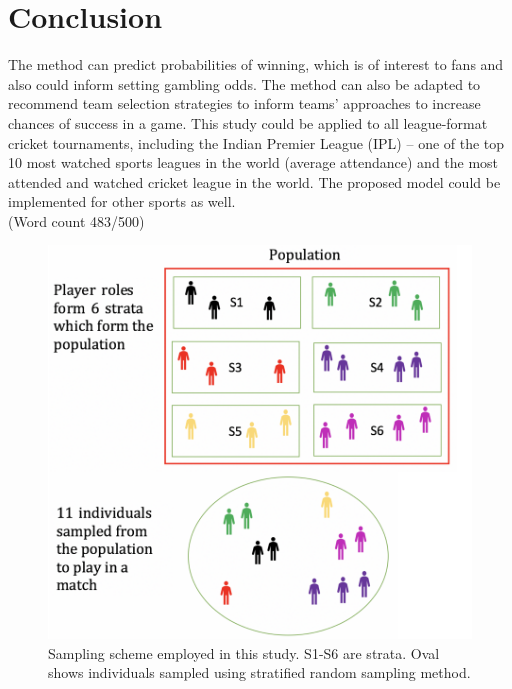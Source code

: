 \documentclass[paper=a4, 12pt, twoside]{article}
\begin{document}
			\section*{Conclusion}\label{conclusion}
		 The method can predict probabilities of winning, which is of interest to fans and also could inform setting gambling odds. The method can also be adapted to recommend team selection strategies to inform teams' approaches to increase chances of success in a game. This study could be applied to all league-format cricket tournaments, including the Indian Premier League (IPL) -- one of the top 10 most watched sports leagues in the world (average attendance) and the most attended and watched cricket league in the world. The proposed model could be implemented for other sports as well. \\
		 (Word count 483/500)
\cleardoublepage
 \begin{figure}[h]
	\centering
	\includegraphics[scale=0.70]{samplingscheme} 
	\caption{Sampling scheme employed in this study. S1-S6 are strata. Oval shows individuals sampled using stratified random sampling method. }
	\label{samplingscheme}
\end{figure}
\end{document}
